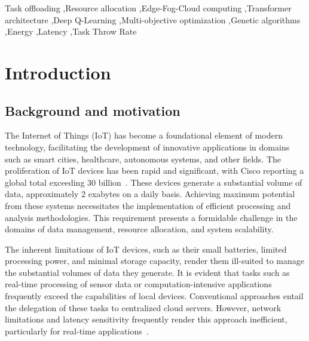 \documentclass[preprint,3p,authoryear]{elsarticle}
\begin{document}
\begin{frontmatter}
\begin{keyword}
Task offloading \sep Resource allocation \sep Edge-Fog-Cloud computing \sep Transformer architecture \sep Deep Q-Learning \sep Multi-objective optimization \sep Genetic algorithms \sep Energy \sep Latency \sep Task Throw Rate



\end{keyword}

\end{frontmatter}



\section{Introduction}\label{sec:introduction}

\subsection{Background and motivation}\label{subsec:background}

The Internet of Things (IoT) has become a foundational element of modern technology, facilitating the development of innovative applications in domains such as smart cities, healthcare, autonomous systems, and other fields. The proliferation of IoT devices has been rapid and significant, with Cisco reporting a global total exceeding 30 billion~\citep{benaboura_comprehensive_nodate}. These devices generate a substantial volume of data, approximately 2 exabytes on a daily basis. Achieving maximum potential from these systems necessitates the implementation of efficient processing and analysis methodologies. This requirement presents a formidable challenge in the domains of data management, resource allocation, and system scalability.

The inherent limitations of IoT devices, such as their small batteries, limited processing power, and minimal storage capacity, render them ill-suited to manage the substantial volumes of data they generate. It is evident that tasks such as real-time processing of sensor data or computation-intensive applications frequently exceed the capabilities of local devices. Conventional approaches entail the delegation of these tasks to centralized cloud servers. However, network limitations and latency sensitivity frequently render this approach inefficient, particularly for real-time applications~\citep{benaboura_comprehensive_nodate}.
\end{document}
